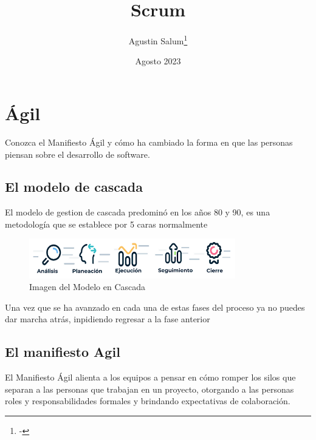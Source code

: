 \documentclass[12pt, letterpaper]{article}
\title{Scrum}
\author{Agustin Salum\thanks{-}}
\date{Agosto 2023}
\begin{document}
\maketitle

    \tableofcontents %
\newpage


\section{Ágil}
Conozca el Manifiesto Ágil y cómo ha cambiado la forma en que las personas piensan sobre el desarrollo de 
software.


\subsection{El modelo de cascada}
El modelo de gestion de cascada predominó en los años 80 y 90, es una metodología que se establece por 5 
caras normalmente

\vspace{10pt} %

\begin{figure}[ht] %
    \centering
    \includegraphics[width=0.8\textwidth]{imagenes/cascada.png}
    \caption{Imagen del Modelo en Cascada}
    \label{fig:cascada}
  \end{figure}

\vspace{10pt} %

Una vez que se ha avanzado en cada una de estas fases del proceso ya no puedes dar marcha atrás, inpidiendo 
regresar a la fase anterior



\subsection{El manifiesto Agil}

El Manifiesto Ágil alienta a los equipos a pensar en cómo romper los silos que separan a las personas que 
trabajan en un proyecto, otorgando a las personas roles y responsabilidades formales y brindando expectativas 
de colaboración.
\end{document}

